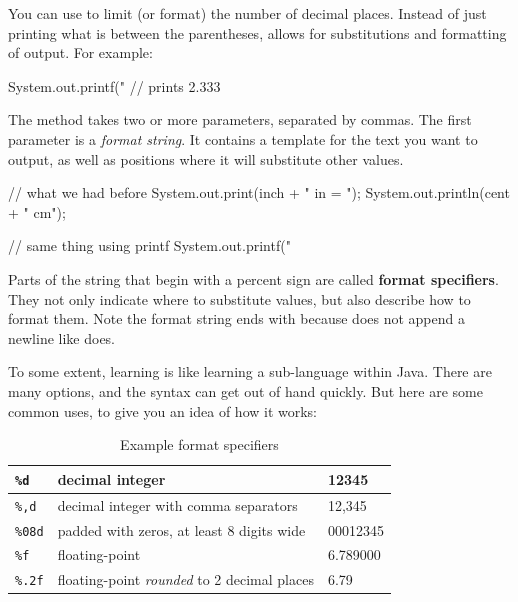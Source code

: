 
You can use  to limit (or format) the number of decimal places.
Instead of just printing what is between the parentheses,  allows for substitutions and formatting of output.
For example:

\begin{code}
    System.out.printf("%
    // prints 2.333
\end{code}

The  method takes two or more parameters, separated by commas.
The first parameter is a {\em format string}.
It contains a template for the text you want to output, as well as positions where it will substitute other values.

\begin{code}
    // what we had before
    System.out.print(inch + " in = ");
    System.out.println(cent + " cm");

    // same thing using printf
    System.out.printf("%
\end{code}

Parts of the string that begin with a percent sign are called {\bf format specifiers}.
They not only indicate where to substitute values, but also describe how to format them.
Note the format string ends with \java{\\n} because  does not append a newline like  does.

To some extent, learning  is like learning a sub-language within Java.
There are many options, and the syntax can get out of hand quickly.
But here are some common uses, to give you an idea of how it works:

\begin{table}[!h]
\begin{tabular}{|l|l|l|}
\hline
{\tt \%d} & decimal integer & 12345 \\
\hline
{\tt \%,d} & decimal integer with comma separators & 12,345 \\
\hline
{\tt \%08d} & padded with zeros, at least 8 digits wide & 00012345 \\
\hline
{\tt \%f} & floating-point & 6.789000 \\
\hline
{\tt \%.2f} & floating-point {\em rounded} to 2 decimal places & 6.79 \\
\hline
\end{tabular}
\caption{Example format specifiers}
\end{table}

